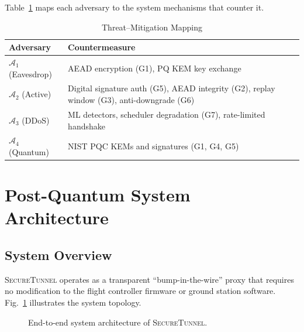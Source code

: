 \documentclass[conference]{IEEEtran}
\newcommand{\sys}{\textsc{SecureTunnel}}
\begin{document}
Table~\ref{tab:threat-mitigation} maps each adversary to the system mechanisms that counter it.

\begin{table}[t]
\centering
\caption{Threat--Mitigation Mapping}
\label{tab:threat-mitigation}
\small
\begin{tabular}{@{}lp{5.5cm}@{}}
\toprule
\textbf{Adversary} & \textbf{Countermeasure} \\
\midrule
$\mathcal{A}_1$ (Eavesdrop) & AEAD encryption (G1), PQ KEM key exchange \\
$\mathcal{A}_2$ (Active) & Digital signature auth (G5), AEAD integrity (G2), replay window (G3), anti-downgrade (G6) \\
$\mathcal{A}_3$ (DDoS) & ML detectors, scheduler degradation (G7), rate-limited handshake \\
$\mathcal{A}_4$ (Quantum) & NIST PQC KEMs and signatures (G1, G4, G5) \\
\bottomrule
\end{tabular}
\end{table}

\section{Post-Quantum System Architecture}
\label{sec:arch}

\subsection{System Overview}

\sys{} operates as a transparent ``bump-in-the-wire'' proxy that requires no modification to the flight controller firmware or ground station software.
Fig.~\ref{fig:arch-overview} illustrates the system topology.

\begin{figure}[t]
    \centering
    \caption{End-to-end system architecture of \sys{}.}
    \label{fig:arch-overview}
\end{figure}
\end{document}
